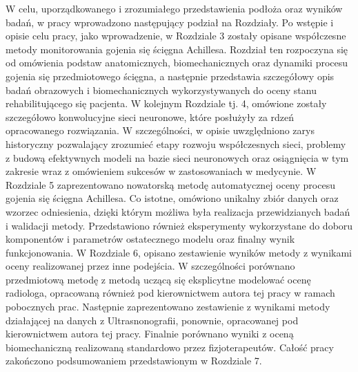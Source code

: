 W celu, uporządkowanego i zrozumiałego przedstawienia podłoża oraz wyników badań, w pracy wprowadzono następujący podział na Rozdziały. Po wstępie i opisie celu pracy, jako wprowadzenie, w Rozdziale 3 zostały opisane współczesne metody monitorowania gojenia się ścięgna Achillesa. Rozdział ten rozpoczyna się od omówienia podstaw anatomicznych, biomechanicznych oraz dynamiki procesu gojenia się przedmiotowego ścięgna, a następnie przedstawia szczegółowy opis badań obrazowych i biomechanicznych wykorzystywanych do oceny stanu rehabilitującego się pacjenta. W kolejnym Rozdziale tj. 4, omówione zostały szczegółowo konwolucyjne sieci neuronowe, które posłużyły za rdzeń opracowanego rozwiązania. W szczególności, w opisie uwzględniono zarys historyczny pozwalający zrozumieć etapy rozwoju współczesnych sieci, problemy z budową efektywnych modeli na bazie sieci neuronowych oraz osiągnięcia w tym zakresie wraz z omówieniem sukcesów w zastosowaniach w medycynie. W Rozdziale 5 zaprezentowano nowatorską metodę automatycznej oceny procesu gojenia się ścięgna Achillesa. Co istotne, omówiono unikalny zbiór danych oraz wzorzec odniesienia, dzięki którym możliwa była realizacja przewidzianych badań i walidacji metody. Przedstawiono również eksperymenty wykorzystane do doboru komponentów i parametrów ostatecznego modelu oraz finalny wynik funkcjonowania. W Rozdziale 6, opisano zestawienie wyników metody z wynikami oceny realizowanej przez inne podejścia. W szczególności porównano przedmiotową metodę z metodą uczącą się eksplicytne modelować ocenę radiologa, opracowaną również pod kierownictwem autora tej pracy w ramach pobocznych prac. Następnie zaprezentowano zestawienie z wynikami metody działającej na danych z Ultrasnonografii, ponownie, opracowanej pod kierownictwem autora tej pracy. Finalnie porównano wyniki z oceną biomechaniczną realizowaną standardowo przez fizjoterapeutów. Całość pracy zakończono podsumowaniem przedstawionym w Rozdziale 7.   



